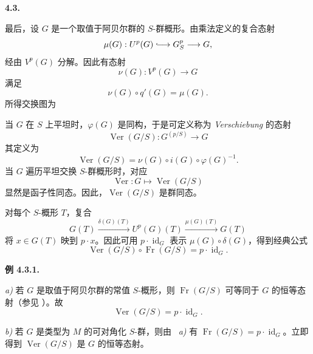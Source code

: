 
\medskip
\noindent\textbf{4.3.}
\label{sga3:VIIA:4.3}

最后，设 \(G\) 是一个取值于阿贝尔群的 \(S\)-群概形。由乘法定义的复合态射
\[
  \mu(G):
  U^p(G)\lhook\joinrel\longrightarrow G_S^p
  \longrightarrow G,
\]
经由 \(V^p(G)\) 分解。因此有态射
\[
  \nu(G):V^p(G)\longrightarrow G
\]
满足
\[
  \nu(G)\circ q'(G)=\mu(G).
\]
所得交换图为
\begin{center}
  \label{sga3:VIIA:4.3-verschiebung-master-diagram}
  
\end{center}

当 \(G\) 在 \(S\) 上平坦时，\(\varphi(G)\) 是同构，于是可定义称为 \emph{Verschiebung} 的态射
\[
  \operatorname{Ver}(G/S):
  G^{(p/S)}
  \longrightarrow
  G
\]
其定义为
\[
  \operatorname{Ver}(G/S)
  =
  \nu(G)\circ i(G)\circ\varphi(G)^{-1}.
\]
当 \(G\) 遍历平坦交换 \(S\)-群概形时，对应
\[
  \operatorname{Ver}:G\longmapsto\operatorname{Ver}(G/S)
\]
显然是函子性同态。因此，\(\operatorname{Ver}(G/S)\) 是群同态。

对每个 \(S\)-概形 \(T\)，复合
\[
  G(T)
  \xrightarrow{\delta(G)(T)}
  U^p(G)(T)
  \xrightarrow{\mu(G)(T)}
  G(T)
\]
将 \(x\in G(T)\) 映到 \(p\cdot x\)。因此可用 \(p\cdot\operatorname{id}_G\) 表示 \(\mu(G)\circ\delta(G)\)，得到经典公式
\[
  \tag{*}\label{sga3:vii:paragraph:4-3:equation:star}
  \operatorname{Ver}(G/S)\circ\operatorname{Fr}(G/S)
  =
  p\cdot\operatorname{id}_G.
\]

\medskip
\noindent\textbf{例 4.3.1.}
\label{sga3:VIIA:4.3.1}

\smallskip
\noindent\textit{a)}
若 \(G\) 是取值于阿贝尔群的常值 \(S\)-概形，则 \(\operatorname{Fr}(G/S)\) 可等同于 \(G\) 的恒等态射（参见 ）。故
\[
  \operatorname{Ver}(G/S)
  =
  p\cdot\operatorname{id}_G.
\]

\smallskip
\noindent\textit{b)}
若 \(G\) 是类型为 \(M\) 的可对角化 \(S\)-群，则由 ~\textit{a)} 有 \(\operatorname{Fr}(G/S)=p\cdot\operatorname{id}_G\)。立即得到 \(\operatorname{Ver}(G/S)\) 是 \(G\) 的恒等态射。

